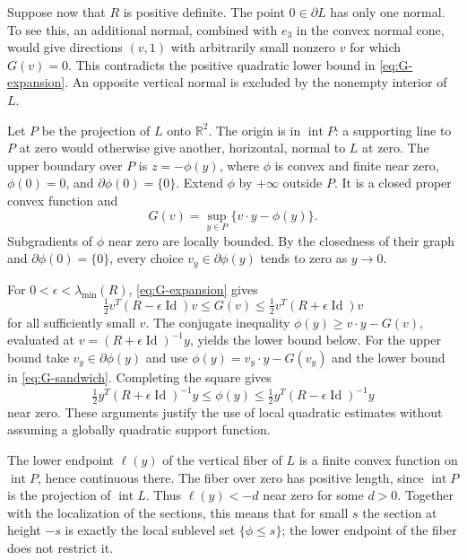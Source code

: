 \documentclass[11pt,a4paper]{article}
\theoremstyle{definition}
\theoremstyle{remark}
\newcommand{\R}{\mathbb R}
\newcommand{\id}{\operatorname{Id}}
\numberwithin{equation}{section}
\begin{document}
Suppose now that $R$ is positive definite. The point $0\in\partial L$
has only one normal. To see this, an additional normal, combined with
$e_3$ in the convex normal cone, would give directions $(v,1)$ with
arbitrarily small nonzero $v$ for which $G(v)=0$. This contradicts the
positive quadratic lower bound in \eqref{eq:G-expansion}.
An opposite vertical normal is excluded by the nonempty interior of $L$.

Let $P$ be the projection of $L$ onto $\R^2$. The origin is in
$\operatorname{int}P$: a supporting line to $P$ at zero would otherwise
give another, horizontal, normal to $L$ at zero. The upper boundary
over $P$ is $z=-\phi(y)$, where $\phi$ is convex and finite near zero,
$\phi(0)=0$, and $\partial\phi(0)=\{0\}$. Extend $\phi$ by $+\infty$
outside $P$. It is a closed proper convex function and
\[
 G(v)=\sup_{y\in P}\{v\cdot y-\phi(y)\}.
\]
Subgradients of $\phi$ near zero are locally bounded. By the closedness
of their graph and $\partial\phi(0)=\{0\}$, every choice
$v_y\in\partial\phi(y)$ tends to zero as $y\to0$.

For $0<\epsilon<\lambda_{\min}(R)$, \eqref{eq:G-expansion} gives
\begin{equation}\label{eq:G-sandwich}
 \tfrac12v^T(R-\epsilon\id)v\le G(v)
 \le\tfrac12v^T(R+\epsilon\id)v
\end{equation}
for all sufficiently small $v$. The conjugate inequality
$\phi(y)\ge v\cdot y-G(v)$, evaluated at
$v=(R+\epsilon\id)^{-1}y$, yields the lower bound below.
For the upper bound take $v_y\in\partial\phi(y)$ and use
$\phi(y)=v_y\cdot y-G(v_y)$ and the lower bound in
\eqref{eq:G-sandwich}. Completing the square gives
\begin{equation}\label{eq:phi-sandwich}
 \tfrac12y^T(R+\epsilon\id)^{-1}y
 \le\phi(y)\le
 \tfrac12y^T(R-\epsilon\id)^{-1}y
\end{equation}
near zero. These arguments justify the use of local quadratic estimates
without assuming a globally quadratic support function.

The lower endpoint $\ell(y)$ of the vertical fiber of $L$ is a finite
convex function on $\operatorname{int}P$, hence continuous there.
The fiber over zero has positive length, since
$\operatorname{int}P$ is the projection of $\operatorname{int}L$.
Thus $\ell(y)<-d$ near zero for some $d>0$.
Together with the localization of the sections, this means that for
small $s$ the section at height $-s$ is exactly the local sublevel set
$\{\phi\le s\}$; the lower endpoint of the fiber does not restrict it.
\end{document}
